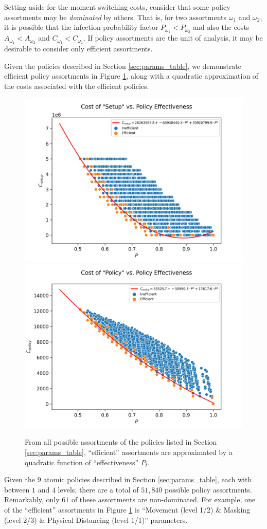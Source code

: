 \documentclass{article}
\begin{document}
Setting aside for the moment switching costs, consider that some policy assortments may be \emph{dominated} by others. That is, for two assortments $\omega_1$ and $\omega_2$, it is possible that the infection probability factor $P_{\omega_1} < P_{\omega_2}$ and also the costs $A_{\omega_1} < A_{\omega_2}$ and $C_{\omega_1} < C_{\omega_2}$. If policy assortments are the unit of analysis, it may be desirable to consider only efficient assortments.

Given the policies described in Section \ref{sec:params_table}, we demonstrate efficient policy assortments in Figure \ref{fig:policy_approx}, along with a quadratic approximation of the costs associated with the efficient policies.


\begin{figure}[H]
    \center
    \includegraphics[width=0.46\linewidth]{figures/efficient_policies_setup.png}
    \includegraphics[width=0.46\linewidth]{figures/efficient_policies_policy.png}
    \caption{From all possible assortments of the policies listed in Section \ref{sec:params_table}, ``efficient'' assortments are approximated by a quadratic function of ``effectiveness'' $P_t$.}\label{fig:policy_approx}
\end{figure}

Given the $9$ atomic policies described in Section \ref{sec:params_table}, each with between $1$ and $4$ levels, there are a total of $51,840$ possible policy assortments. Remarkably, only $61$ of these assortments are non-dominated. For example, one of the ``efficient'' assortments in Figure \ref{fig:policy_approx} is ``Movement (level 1/2) \& Masking (level 2/3) \& Physical Distancing (level 1/1)'' parameters.
\end{document}
